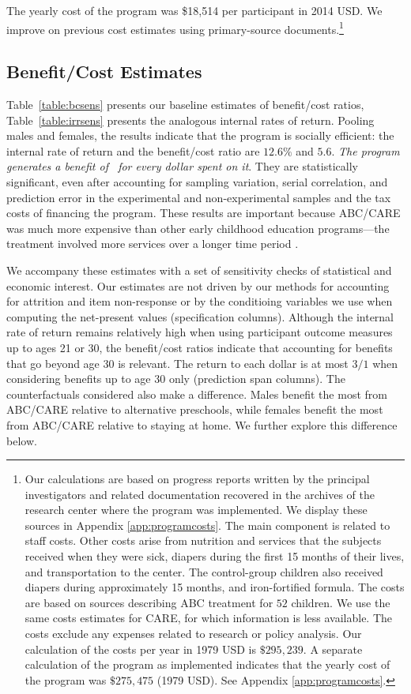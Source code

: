The yearly cost of the program was \$18,514 per participant in 2014 USD. We improve on previous cost estimates using primary-source documents.\footnote{Our calculations are based on progress reports written by the principal investigators and related documentation recovered in the archives of the research center where the program was implemented. We display these sources in Appendix \ref{app:programcosts}. The main component is related to staff costs. Other costs arise from nutrition and services that the subjects received when they were sick, diapers during the first 15 months of their lives, and transportation to the center. The control-group children also received diapers during approximately 15 months, and iron-fortified formula. The costs are based on sources describing ABC treatment for $52$ children. We use the same costs estimates for CARE, for which information is less available. The costs exclude any expenses related to research or policy analysis. Our calculation of the costs per year in 1979 USD is $\$295,239$. A separate calculation of the program as implemented indicates that the yearly cost of the program was $\$275,475$ (1979 USD). See Appendix \ref{app:programcosts}.}

\subsection{Benefit/Cost Estimates}

Table~\ref{table:bcsens} presents our baseline estimates of benefit/cost ratios, Table~\ref{table:irrsens} presents the analogous internal rates of return. Pooling males and females, the results indicate that the program is socially efficient: the internal rate of return and the benefit/cost ratio are $12.6\%$ and $5.6$. \textit{The program generates a benefit of \bcp\ for every dollar spent on it}. They are statistically significant, even after accounting for sampling variation, serial correlation, and prediction error in the experimental and non-experimental samples and the tax costs of financing the program. These results are important because ABC/CARE was much more expensive than other early childhood education programs---the treatment involved more services over a longer time period \citep{Elango_Hojman_etal_2016_Early-Edu}.

We accompany these estimates with a set of sensitivity checks of statistical and economic interest. Our estimates are not driven by our methods for accounting for attrition and item non-response or by the conditioing variables we use when computing the net-present values (specification columns).  Although the internal rate of return remains relatively high when using participant outcome measures up to ages 21 or 30, the benefit/cost ratios indicate that accounting for benefits that go beyond age 30 is relevant. The return to each dollar is at most $3/1$ when considering benefits up to age 30 only (prediction span columns). The counterfactuals considered also make a difference. Males benefit the most from ABC/CARE relative to alternative preschools, while females benefit the most from ABC/CARE relative to staying at home. We further explore this difference below.

